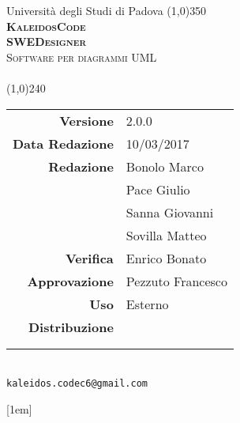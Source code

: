 \documentclass[a4paper,12pt]{article}
\author{KaleidosCode}
\date{10/03/2017}	%
\date{\today}
\begin{document}
	\begin{titlepage}
		\centering Università degli Studi di Padova
		\line(1,0){350}\\
		\vspace{0.4cm}
		{\bfseries\scshape\LARGE KaleidosCode\\}
		\vspace{0.4cm}
		{\bfseries\scshape\LARGE SWEDesigner\\}
		{\scshape\Large Software per diagrammi UML\\}
		\vspace{1cm}
		{\scshape\Large \glossarioi\ \\}		%
		\vspace{1.4cm}
		\logo
		\vspace{1.2cm}
		\line(1,0){240}\\
		\begin{tabular}{r|l}
			{\hfill \textbf{Versione}} 			& 2.0.0\\
			{\hfill \textbf{Data Redazione}} 	& 10/03/2017\\	%
			{\hfill \textbf{Redazione}} 		& Bonolo Marco\\ & Pace Giulio\\ & Sanna Giovanni\\ & Sovilla Matteo\\
			{\hfill \textbf{Verifica}} 			& Enrico Bonato\\
			{\hfill \textbf{Approvazione}} 		& Pezzuto Francesco\\
			{\hfill \textbf{Uso}} 				& Esterno\\
			{\hfill \textbf{Distribuzione}} 	& \vardanega \\ & \cardin \\ & \proponente\\
		\end{tabular}\\
		\vspace{2cm}
		\texttt{kaleidos.codec6@gmail.com}
	\end{titlepage}
	
	\pagestyle{myfront}
	\newpage
		
	\newpage
		[1em]{}{\bfseries\fontsize{0.8em}{0.8em}}{}{\contentspage}
		\tableofcontents
	\newpage
	\pagestyle{mymain}
		\titleformat{\section}[block]{\bfseries\fontsize{20pt}{20pt}\selectfont}{}{-0.8em}{}
		\printglossary[style=myaltlistgroup, title=, toctitle=Glossario dei termini]
		\glsaddall

	\label{LastPage}
\end{document}
